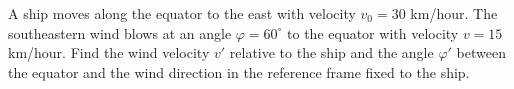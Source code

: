 
\item A ship moves along the equator to the east with velocity \( v_0 = 30 \) km/hour. The southeastern wind blows at an angle \( \varphi = 60^\circ \) to the equator with velocity \( v = 15 \) km/hour. Find the wind velocity \( v' \) relative to the ship and the angle \( \varphi' \) between the equator and the wind direction in the reference frame fixed to the ship.
